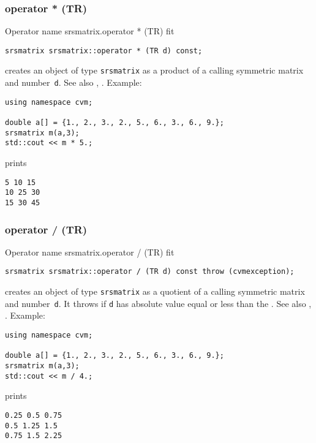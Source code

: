 \subsubsection{operator * (TR)}
Operator%
\pdfdest name {srsmatrix.operator * (TR)} fit
\begin{verbatim}
srsmatrix srsmatrix::operator * (TR d) const;
\end{verbatim}
creates an object of type \verb"srsmatrix" as a product of
a calling symmetric matrix and  number~\verb"d".
See also ,
.
Example:
\begin{Verbatim}
using namespace cvm;

double a[] = {1., 2., 3., 2., 5., 6., 3., 6., 9.};
srsmatrix m(a,3);
std::cout << m * 5.;
\end{Verbatim}
prints
\begin{Verbatim}
5 10 15
10 25 30
15 30 45
\end{Verbatim}
\newpage



\subsubsection{operator / (TR)}
Operator%
\pdfdest name {srsmatrix.operator / (TR)} fit
\begin{verbatim}
srsmatrix srsmatrix::operator / (TR d) const throw (cvmexception);
\end{verbatim}
creates an object of type \verb"srsmatrix" as a quotient of
a calling symmetric matrix and  number~\verb"d". It throws
if \verb"d" has  absolute value equal or less than the
.
See also ,
.
Example:
\begin{Verbatim}
using namespace cvm;

double a[] = {1., 2., 3., 2., 5., 6., 3., 6., 9.};
srsmatrix m(a,3);
std::cout << m / 4.;
\end{Verbatim}
prints
\begin{Verbatim}
0.25 0.5 0.75
0.5 1.25 1.5
0.75 1.5 2.25
\end{Verbatim}
\newpage



